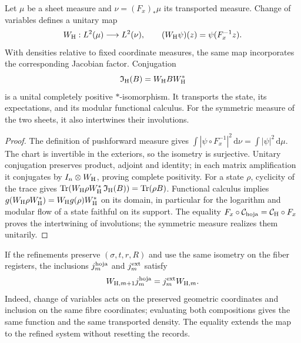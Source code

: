 \begin{proposition}
\label{x_reciprocidad:vii:prop:transporte-unitario-horizonte}
Let \(\mu\) be a sheet measure and \(\nu=(F_x)_*\mu\) its
transported measure. Change of variables defines a unitary map
\begin{equation}
 W_{\rm H}:L^2(\mu)\longrightarrow L^2(\nu),\qquad
 (W_{\rm H}\psi)(z)=\psi(F_x^{-1}z).
 \label{x_reciprocidad:vii:eq:unitaria-horizonte}
\end{equation}
With densities relative to fixed coordinate measures, the same
map incorporates the corresponding Jacobian factor.
Conjugation
\begin{equation}
 \mathfrak I_{\rm H}(B)=W_{\rm H}BW_{\rm H}^*
 \label{x_reciprocidad:vii:eq:mapa-observables-horizonte}
\end{equation}
is a unital completely positive \(*\)-isomorphism. It transports the
state, its expectations, and its modular functional calculus. For the
symmetric measure of the two sheets, it also intertwines their involutions.
\end{proposition}
\begin{proof}
The definition of pushforward measure gives
\(\int|\psi\circ F_x^{-1}|^2\,\mathrm d\nu
=\int|\psi|^2\,\mathrm d\mu\).
The chart is invertible in the exteriors, so the isometry is
surjective. Unitary conjugation preserves product, adjoint and
identity; in each matrix amplification it conjugates by
\(I_n\otimes W_{\rm H}\), proving complete positivity.
For a state \(\rho\), cyclicity of the trace gives
\(\operatorname{Tr}(W_{\rm H}\rho W_{\rm H}^*
\,\mathfrak I_{\rm H}(B))=\operatorname{Tr}(\rho B)\).
Functional calculus implies
\(g(W_{\rm H}\rho W_{\rm H}^*)=W_{\rm H}g(\rho)W_{\rm H}^*\)
on its domain, in particular for the logarithm and modular flow of
a state faithful on its support. The equality
\(F_x\circ\mathcal C_{\rm hoja}=\mathcal C_{\rm H}\circ F_x\)
proves the intertwining of involutions; the symmetric measure realizes them
unitarily.
\end{proof}

If the refinements preserve \((\sigma,t,r,R)\) and use the same
isometry on the fiber registers, the inclusions
\(j_m^{\rm hoja}\) and \(j_m^{\rm ext}\) satisfy
\begin{equation}
 W_{{\rm H},m+1}j_m^{\rm hoja}
 =j_m^{\rm ext}W_{{\rm H},m}.
 \label{x_reciprocidad:vii:eq:naturalidad-horizonte}
\end{equation}
Indeed, change of variables acts on the preserved geometric coordinates
and inclusion on the same fibre coordinates; evaluating
both compositions gives the same function and the same transported density.
The equality extends the map to the refined system without resetting the records.

